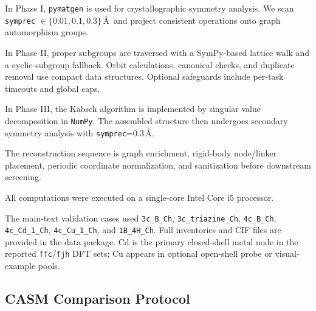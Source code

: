 \documentclass[pdflatex,sn-mathphys-num]{sn-jnl}
\theoremstyle{thmstyleone}%
\begin{document}
In Phase I, \texttt{pymatgen} is used for crystallographic symmetry analysis. We scan \texttt{symprec} $\in \{0.01, 0.1, 0.3\}$\,\AA\ and project consistent operations onto graph automorphism groups.

In Phase II, proper subgroups are traversed with a SymPy-based lattice walk and a cyclic-subgroup fallback. Orbit calculations, canonical checks, and duplicate removal use compact data structures. Optional safeguards include per-task timeouts and global caps.

In Phase III, the Kabsch algorithm is implemented by singular value decomposition in \texttt{NumPy}. The assembled structure then undergoes secondary symmetry analysis with \texttt{symprec}=0.3\,\AA.

The reconstruction sequence is graph enrichment, rigid-body node/linker placement, periodic coordinate normalization, and sanitization before downstream screening.

All computations were executed on a single-core Intel Core i5 processor.

The main-text validation cases used \texttt{3c\_B\_Ch}, \texttt{3c\_triazine\_Ch}, \texttt{4c\_B\_Ch}, \texttt{4c\_Cd\_1\_Ch}, \texttt{4c\_Cu\_1\_Ch}, and \texttt{1B\_4H\_Ch}. Full inventories and CIF files are provided in the data package. Cd is the primary closed-shell metal node in the reported \texttt{ffc}/\texttt{fjh} DFT sets; Cu appears in optional open-shell probe or visual-example pools.

\subsection*{CASM Comparison Protocol}
\end{document}
